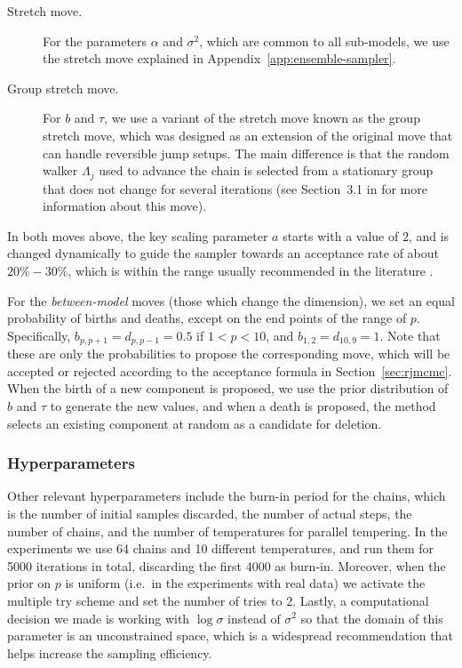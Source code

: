 \begin{description}
  \item[Stretch move.] For the parameters \(\alpha\) and \(\sigma^2\), which are common to all sub-models, we use the stretch move explained in Appendix~\ref{app:ensemble-sampler}.
  \item[Group stretch move.] For \(b\) and \(\tau\), we use a variant of the stretch move known as the group stretch move, which was designed as an extension of the original move that can handle reversible jump setups. The main difference is that the random walker \(\Lambda_j\) used to advance the chain is selected from a stationary group that does not change for several iterations (see Section~3.1 in \citealp{karnesis2023eryn} for more information about this move).
\end{description}
In both moves above, the key scaling parameter \(a\) starts with a value of \(2\), and is changed dynamically to guide the sampler towards an acceptance rate of about \(20\%-30\%\), which is within the range usually recommended in the literature \citep[e.g.][]{rosenthal2011optimal}.

For the \textit{between-model} moves (those which change the dimension), we set an equal probability of births and deaths, except on the end points of the range of \(p\). Specifically, \(b_{p,p+1}=d_{p, p-1}=0.5\) if \(1<p<10\), and \(b_{1,2}=d_{10,9}=1\). Note that these are only the probabilities to propose the corresponding move, which will be accepted or rejected according to the acceptance formula in Section~\ref{sec:rjmcmc}. When the birth of a new component is proposed, we use the prior distribution of \(b\) and \(\tau\) to generate the new values, and when a death is proposed, the method selects an existing component at random as a candidate for deletion.

\subsubsection*{Hyperparameters}

Other relevant hyperparameters include the burn-in period for the chains, which is the number of initial samples discarded, the number of actual steps, the number of chains, and the number of temperatures for parallel tempering. In the experiments we use 64 chains and 10 different temperatures, and run them for 5000 iterations in total, discarding the first 4000 as burn-in. Moreover, when the prior on \(p\) is uniform (i.e.~in the experiments with real data) we activate the multiple try scheme and set the number of tries to \(2\). Lastly, a computational decision we made is working with \(\log \sigma\) instead of \(\sigma^2\) so that the domain of this parameter is an unconstrained space, which is a widespread recommendation that helps increase the sampling efficiency.


